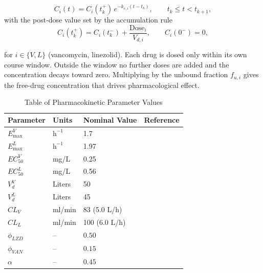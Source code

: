 \documentclass[12pt, draftcls, onecolumn]{IEEEtran}
\begin{document}
\begin{equation}
C_i(t) = C_i(t_k^{+})\, e^{-k_{e,i}(t - t_k)},
\qquad t_k \le t < t_{k+1},
\label{eq:pk}
\end{equation}
with the post-dose value set by the accumulation rule
\begin{equation}
C_i(t_k^{+}) = C_i(t_k^{-}) + \frac{\mathrm{Dose}_i}{V_{d,i}},
\qquad C_i(0^{-}) = 0 ,
\label{eq:pkdose}
\end{equation}


for $i \in \{V, L\}$ (vancomycin, linezolid). Each drug is dosed only within
its own course window. Outside the window no further doses are added and the
concentration decays toward zero. Multiplying by the unbound fraction
$f_{u,i}$ gives the free-drug concentration that drives pharmacological effect.



\begin{table}[H]
\centering
\large %
\renewcommand{\arraystretch}{1.35} %
\caption{Table of Pharmacokinetic Parameter Values}\label{tab:PKparams}
\vspace{0.3cm} %
\begin{tabular}{l l l l} %
\hline
\textbf{Parameter} & \textbf{Units} & \textbf{Nominal Value} & \textbf{Reference} \\
\hline
$E_{\max}^{V}$ & $\mathrm{h^{-1}}$ & 1.7 & \cite{VeraYunca2025}\\
$E_{\max}^{L}$ & $\mathrm{h^{-1}}$ & 1.97 & \cite{VeraYunca2025}\\
$EC_{50}^{V}$ & mg/L & 0.25 & \cite{VeraYunca2025}\\
$EC_{50}^{L}$ & mg/L & 0.56 & \cite{VeraYunca2025}\\
$V_d^{V}$ & Liters & 50 & \cite{Matzke1986} \\
$V_d^{L}$ & Liters & 45  &  \cite{dryden2011linezolid} \\
$CL_{V}$ & ml/min & 83 (5.0 L/h) & \cite{Matzke1986} \\
$CL_{L}$ & ml/min & 100 (6.0 L/h) & \cite{dryden2011linezolid} \\
$\phi_{LZD}$           & --                  & $0.50$              & \cite{dryden2011linezolid} \cite{kutschalissberg2003linezolid} \\
$\phi_{VAN}$           & --                  & $0.15$              & \cite{MomoduSavaliya2023} \cite{spellberg2012systemic} \\
$\alpha$               & --                  & $0.45$              & \cite{VeraYunca2025} \\
\hline
\end{tabular}
\end{table}
\end{document}
